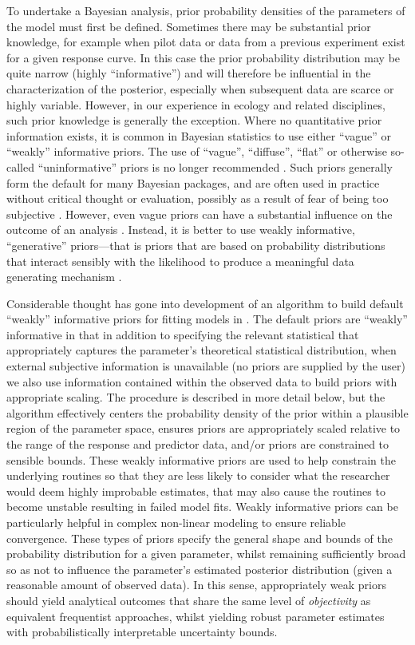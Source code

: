 \documentclass[
  shortnames]{jss}
\begin{document}
To undertake a Bayesian analysis, prior probability densities of the parameters of the model must first be defined. Sometimes there may be substantial prior knowledge, for example when pilot data or data from a previous experiment exist for a given response curve. In this case the prior probability distribution may be quite narrow (highly ``informative'') and will therefore be influential in the characterization of the posterior, especially when subsequent data are scarce or highly variable. However, in our experience in ecology and related disciplines, such prior knowledge is generally the exception. Where no quantitative prior information exists, it is common in Bayesian statistics to use either ``vague'' or ``weakly'' informative priors. The use of ``vague'', ``diffuse'', ``flat'' or otherwise so-called ``uninformative'' priors is no longer recommended \citep{Banner2020}. Such priors generally form the default for many Bayesian packages, and are often used in practice without critical thought or evaluation, possibly as a result of fear of being too subjective \citep{Banner2020}. However, even vague priors can have a substantial influence on the outcome of an analysis \citep{depaoli2020importance, gelman2017entropy}. Instead, it is better to use weakly informative, ``generative'' priors---that is priors that are based on probability distributions that interact sensibly with the likelihood to produce a meaningful data generating mechanism \citep{gelman2017entropy}.

Considerable thought has gone into development of an algorithm to build default ``weakly'' informative priors for fitting models in . The default priors are ``weakly'' informative in that in addition to specifying the relevant statistical  that appropriately captures the parameter's theoretical statistical distribution, when external
subjective information is unavailable (no priors are supplied by the user) we also use information contained within the observed data to build priors with appropriate scaling. The procedure is described in more detail below, but the algorithm effectively centers the probability density of the prior within a plausible region of the parameter space, ensures priors are appropriately scaled relative to the range of the response and predictor data, and/or priors are constrained to sensible bounds. These weakly informative priors are used to help constrain the underlying routines so that they are less likely to consider what the researcher would deem highly improbable estimates, that may also cause the routines to become unstable resulting in failed model fits. Weakly informative priors can be particularly helpful in complex non-linear modeling to ensure reliable convergence. These types of priors specify the general shape and bounds of the probability distribution for a given parameter, whilst remaining sufficiently broad so as not to influence the parameter's estimated posterior distribution (given a reasonable amount of observed data). In this sense, appropriately weak priors should yield analytical outcomes that share the same level of \emph{objectivity} as equivalent frequentist approaches, whilst yielding robust parameter estimates with probabilistically interpretable uncertainty bounds.
\end{document}
